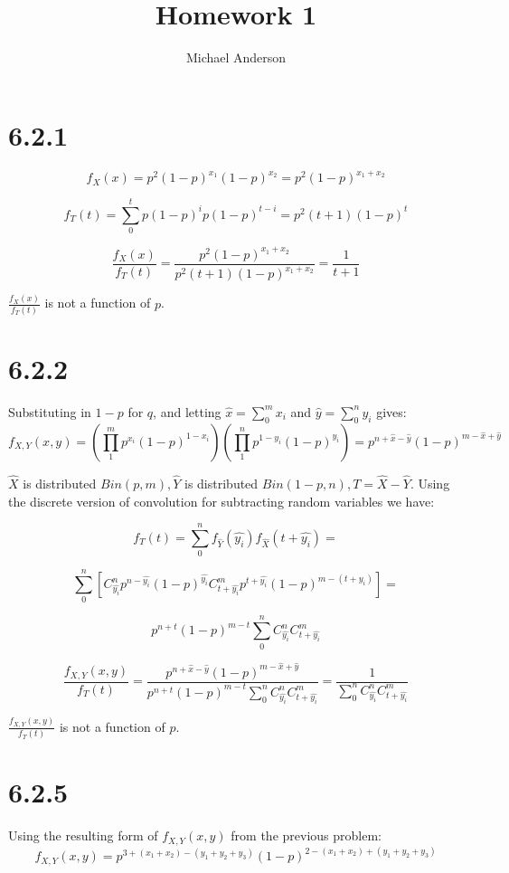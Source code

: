 \documentclass{article}
\author{Michael Anderson}
\title{Homework 1}
\begin{document}
\setlength{\parskip}{1em}
\maketitle
{}
\flushleft
\newpage

\section{6.2.1}
\[
f_X(x) = p^2(1-p)^{x_1}(1-p)^{x_2} = p^2(1-p)^{x_1+x_2}
\]

\[
f_T(t) = \sum_0^t p(1-p)^i p(1-p)^{t-i} = p^2(t+1)(1-p)^t
\]

\[
\frac{f_X(x)}{f_T(t)} = \frac{p^2(1-p)^{x_1+x_2}}{p^2(t+1)(1-p)^{x_1+x_2}} =
\frac{1}{t+1}
\]

$\frac{f_X(x)}{f_T(t)}$ is not a function of $p$.

\section{6.2.2}
Substituting in $1-p$ for $q$, and letting $\hat x = \sum_0^m x_i$ and 
$\hat y = \sum_0^n y_i$ gives:
\[
f_{X,Y}(x,y) = \left( \prod_1^m p^{x_i}(1-p)^{1-x_i} \right)
\left( \prod_1^n p^{1-y_i}(1-p)^{y_i} \right) =
p^{n+\hat x - \hat y}(1-p)^{m-\hat x + \hat y}
\]

$\hat X$ is distributed $Bin(p,m), \hat Y$ is distributed 
$Bin(1-p,n), T = \hat X - \hat Y$. Using the discrete version of convolution for
subtracting random variables we have:

\[
f_T(t) = \sum_0^n f_{\hat Y}(\hat{y_i})f_{\hat X}(t+\hat{y_i}) =
\]

\[
\sum_0^n \left[ C^n_{\hat{y_i}} p^{n-\hat{y_i}}(1-p)^{\hat{y_i}}
C^m_{t+\hat{y_i}} p^{t+\hat{y_i}}(1-p)^{m-(t+y_i)}\right] =
\]

\[
p^{n+t}(1-p)^{m-t} \sum_0^nC^n_{\hat{y_i}}C^m_{t+\hat{y_i}}
\]

\[
\frac{f_{X,Y}(x,y)}{f_T(t)} = \frac{p^{n+\hat x - \hat y}(1-p)^{m-\hat x + 
\hat y}}{p^{n+t}(1-p)^{m-t} \sum_0^nC^n_{\hat{y_i}}C^m_{t+\hat{y_i}}} =
\frac{1}{\sum_0^nC^n_{\hat{y_i}}C^m_{t+\hat{y_i}}}
\]

$\frac{f_{X,Y}(x,y)}{f_T(t)}$ is not a function of $p$.

\section{6.2.5}
Using the resulting form of $f_{X,Y}(x,y)$ from the previous problem:
\[
f_{X,Y}(x,y) = p^{3+(x_1+x_2)-(y_1+y_2+y_3)}(1-p)^{2-(x_1+x_2)+(y_1+y_2+y_3)}
\]
\end{document}
